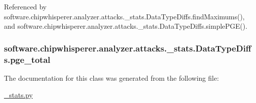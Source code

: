 Referenced by software.\+chipwhisperer.\+analyzer.\+attacks.\+\_\+stats.\+Data\+Type\+Diffs.\+find\+Maximums(), and software.\+chipwhisperer.\+analyzer.\+attacks.\+\_\+stats.\+Data\+Type\+Diffs.\+simple\+P\+G\+E().

\hypertarget{classsoftware_1_1chipwhisperer_1_1analyzer_1_1attacks_1_1__stats_1_1DataTypeDiffs_a752f16f1266b80163aa5913aece61a28}{}
\subsubsection[{pge\+\_\+total}]{\setlength{\rightskip}{0pt plus 5cm}software.\+chipwhisperer.\+analyzer.\+attacks.\+\_\+stats.\+Data\+Type\+Diffs.\+pge\+\_\+total}\label{classsoftware_1_1chipwhisperer_1_1analyzer_1_1attacks_1_1__stats_1_1DataTypeDiffs_a752f16f1266b80163aa5913aece61a28}


The documentation for this class was generated from the following file\+:\begin{DoxyCompactItemize}
\item 
\hyperlink{__stats_8py}{\+\_\+stats.\+py}\end{DoxyCompactItemize}
